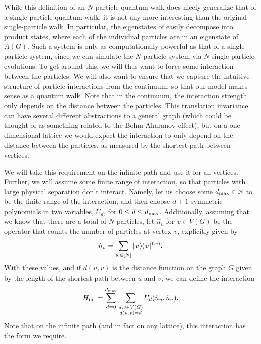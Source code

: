 \documentclass[../thesis-main/thesis-main]{subfiles}
\begin{document}
While this definition of an $N$-particle quantum walk does nicely generalize that of a single-particle quantum walk, it is not any more interesting than the original single-particle walk.  In particular, the eigenstates of  easily decompose into product states, where each of the individual particles are in an eigenstate of $A(G)$.  Such a system is only as computationally powerful as that of a single-particle system, since we can simulate the $N$-particle system via $N$ single-particle evolutions.  To get around this, we will thus want to force some interaction between the particles. We will also want to ensure that we capture the intuitive structure of particle interactions from the continuum, so that our model makes sense as a quantum walk.  Note that in the continuum, the interaction strength only depends on the distance between the particles.  This translation invariance can have several different abstractions to a general graph (which could be thought of as something related to the Bohm-Aharanov effect), but on a one dimensional lattice we would expect the interaction to only depend on the distance between the particles, as measured by the shortest path between vertices.

We will take this requirement on the infinite path and use it for all vertices.  Further, we will assume some finite range of interaction, so that particles with large physical separation don't interact.   Namely, let us choose some $d_{\text{max}} \in \mathbb{N}$ to be the finite range of the interaction, and then choose $d+1$ symmetric polynomials in two variables, $U_{d}$, for $0\leq d \leq d_{\text{max}}$.  Additionally, assuming that we know that there are a total of $N$ particles, let $\hat{n}_v$ for $v\in V(G)$ be the operator that counts the number of particles at vertex $v$, explicitly given by 
\begin{align}
  \hat{n}_v = \sum_{w\in [N]} |\mspace{2mu} v \mspace{2mu} \rangle\mspace{-2mu}\langle\mspace{2mu} v \mspace{2mu} |^{(w)}.\label{eq:n_hat}
\end{align}
With these values, and if $d(u,v)$ is the distance function on the graph $G$ given by the length of the shortest path between $u$ and $v$, we can define the interaction
\begin{align}
  H_{\text{int}} = \sum_{d=0}^{d_{\text{max}}} \sum_{\substack{ u,v\in V(G)\\d(u,v) = d}}U_{d} (\hat{n}_u,\hat{n}_v).\label{eq:MPQW_int}
\end{align}
Note that on the infinite path (and in fact on any lattice), this interaction has the form we require.
\end{document}
